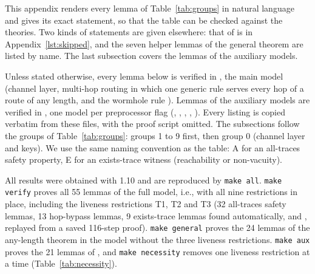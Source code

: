 This appendix renders every lemma of Table~\ref{tab:groups} in natural language and gives its
exact \tamarin{} statement, so that the table can be checked against the theories. Two
kinds of statements are given elsewhere: that of  is in
Appendix~\ref{lst:skipped}, and the seven helper lemmas of the general theorem are listed by name. The last subsection covers the lemmas of the auxiliary models.

Unless stated otherwise, every lemma below is verified in , the main model
(channel layer, multi-hop routing in which one generic rule  serves every hop
of a route of any length, and the wormhole rule ). Lemmas of the auxiliary
models are verified in , one model per preprocessor flag
(, , , , ). Every
listing is copied verbatim from these files, with the proof script omitted. The subsections
follow the groups of Table~\ref{tab:groups}: groups 1 to 9 first, then group 0 (channel layer
and keys). We use the same naming convention as the table: A for an all-traces safety property,
E for an exists-trace witness (reachability or non-vacuity).

All results were obtained with \tamarin{} 1.10 and are reproduced by \texttt{make all}.
\texttt{make verify} proves all 55 lemmas of the full model, i.e., with all nine restrictions in
place, including the liveness restrictions T1, T2 and T3 (32 all-traces safety lemmas, 13
hop-bypass lemmas, 9 exists-trace lemmas found automatically, and
, replayed from a saved 116-step proof). \texttt{make general}
proves the 24 lemmas of the any-length theorem in the model without the three liveness
restrictions. \texttt{make aux} proves the 21 lemmas of , and
\texttt{make necessity} removes one liveness restriction at a time (Table~\ref{tab:necessity}).

